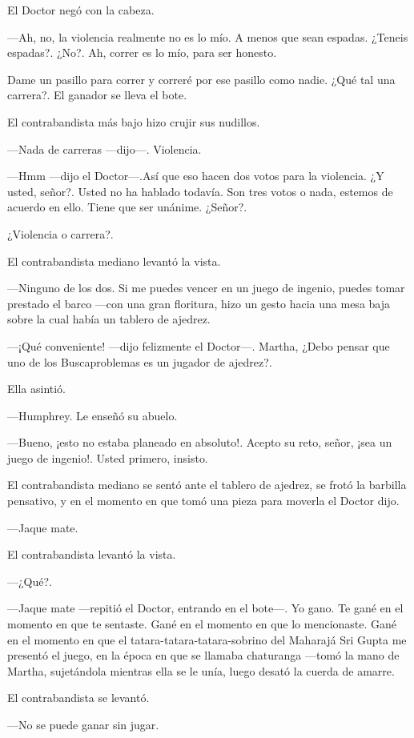 El Doctor negó con la cabeza.

---Ah, no, la violencia realmente no es lo mío. A menos que sean espadas. ¿Teneis espadas?. ¿No?. Ah, correr es lo mío, para ser honesto.

Dame un pasillo para correr y correré por ese pasillo como nadie. ¿Qué tal una carrera?. El ganador se lleva el bote.

El contrabandista más bajo hizo crujir sus nudillos.

---Nada de carreras ---dijo---. Violencia.

---Hmm ---dijo el Doctor---.Así que eso hacen dos votos para la violencia. ¿Y usted, señor?. Usted no ha hablado todavía. Son tres votos o nada, estemos de acuerdo en ello. Tiene que ser unánime. ¿Señor?.

¿Violencia o carrera?.

El contrabandista mediano levantó la vista.

---Ninguno de los dos. Si me puedes vencer en un juego de ingenio, puedes tomar prestado el barco ---con una gran floritura, hizo un gesto hacia una mesa baja sobre la cual había un tablero de ajedrez.

---¡Qué conveniente! ---dijo felizmente el Doctor---. Martha, ¿Debo pensar que uno de los Buscaproblemas es un jugador de ajedrez?.

Ella asintió.

---Humphrey. Le enseñó su abuelo.

---Bueno, ¡esto no estaba planeado en absoluto!. Acepto su reto, señor, ¡sea un juego de ingenio!. Usted primero, insisto.

El contrabandista mediano se sentó ante el tablero de ajedrez, se frotó la barbilla pensativo, y en el momento en que tomó una pieza para moverla el Doctor dijo.

---Jaque mate.

El contrabandista levantó la vista.

---¿Qué?.

---Jaque mate ---repitió el Doctor, entrando en el bote---. Yo gano. Te gané en el momento en que te sentaste. Gané en el momento en que lo mencionaste. Gané en el momento en que el tatara-tatara-tatara-sobrino del Maharajá Sri Gupta me presentó el juego, en la época en que se llamaba chaturanga ---tomó la mano de Martha, sujetándola mientras ella se le unía, luego desató la cuerda de amarre.

El contrabandista se levantó.

---No se puede ganar sin jugar.

